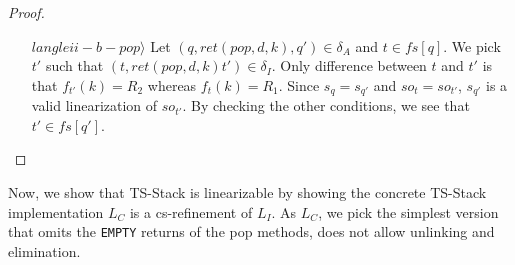 \begin{proof}
\begin{itemize}
\item[$langle ii-b-pop \rangle$] Let $(q, ret(pop,d,k), q') \in \delta_A$ and $t \in fs[q]$. We pick $t'$ such that $(t, ret(pop,d,k) t') \in \delta_I$. Only difference between $t$ and $t'$ is that $f_{t'}(k) = R_2$ whereas $f_t(k) = R_1$. Since $s_q = s_{q'}$ and $so_t = so_{t'}$, $s_{q'}$ is a valid linearization of $so_{t'}$. By checking the other conditions, we see that $t' \in fs[q']$.  
\end{itemize}
\end{proof}

Now, we show that TS-Stack is linearizable by showing the concrete TS-Stack implementation $L_C$ is a cs-refinement of $L_I$. As $L_C$, we pick the simplest version that omits the \texttt{EMPTY} returns of the pop  methods, does not allow unlinking and elimination.